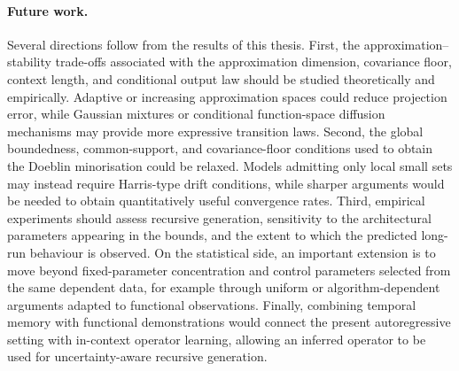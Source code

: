 \paragraph{Future work.}
Several directions follow from the results of this thesis. First, the approximation--stability trade-offs associated with the approximation dimension, covariance floor, context length, and conditional output law should be studied theoretically and empirically. Adaptive or increasing approximation spaces could reduce projection error, while Gaussian mixtures or conditional function-space diffusion mechanisms may provide more expressive transition laws. Second, the global boundedness, common-support, and covariance-floor conditions used to obtain the Doeblin minorisation could be relaxed. Models admitting only local small sets may instead require Harris-type drift conditions, while sharper arguments would be needed to obtain quantitatively useful convergence rates. Third, empirical experiments should assess recursive generation, sensitivity to the architectural parameters appearing in the bounds, and the extent to which the predicted long-run behaviour is observed. On the statistical side, an important extension is to move beyond fixed-parameter concentration and control parameters selected from the same dependent data, for example through uniform or algorithm-dependent arguments adapted to functional observations. Finally, combining temporal memory with functional demonstrations would connect the present autoregressive setting with in-context operator learning, allowing an inferred operator to be used for uncertainty-aware recursive generation.

